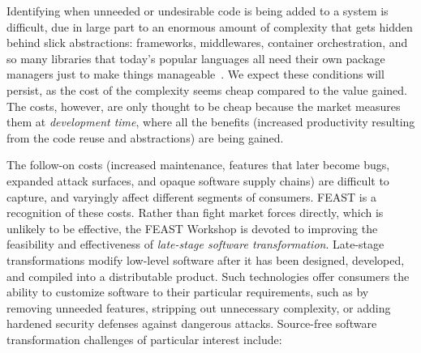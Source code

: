 \documentclass[sigconf]{acmart}
\begin{document}
Identifying when unneeded or undesirable code is being added to a system is
difficult, due in large part to an enormous amount of complexity that gets
hidden behind slick abstractions: frameworks, middlewares, container
orchestration, and so many libraries that today's popular languages all need
their own package managers just to make things manageable~\cite{dusing2022}.  We
expect these conditions will persist, as the cost of the complexity seems cheap
compared to the value gained. The costs, however, are only thought to be cheap
because the market measures them at \emph{development time}, where all the
benefits (increased productivity resulting from the code reuse and abstractions)
are being gained.

The follow-on costs (increased maintenance, features that later become
bugs, expanded attack surfaces, and opaque software supply chains) are difficult
to capture, and varyingly affect different segments of consumers.
FEAST is a recognition of these costs.  
Rather than fight market forces directly, which is unlikely to be effective, the
FEAST Workshop is devoted to improving the feasibility and effectiveness of
\emph{late-stage software transformation}. Late-stage transformations modify
low-level software after it has been designed, developed, and compiled into a
distributable product. Such technologies offer consumers the ability to
customize software to their particular requirements, such as by removing
unneeded features, stripping out unnecessary complexity, or adding hardened
security defenses against dangerous attacks. Source-free software transformation
challenges of particular interest include:
\end{document}
